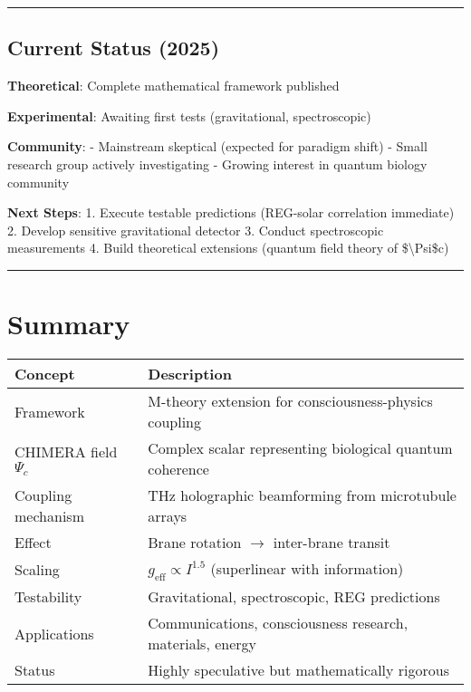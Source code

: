 \begin{center}\rule{0.5\linewidth}{0.5pt}\end{center}

\subsection{Current Status (2025)}\label{current-status-2025}

\textbf{Theoretical}: Complete mathematical framework published

\textbf{Experimental}: Awaiting first tests (gravitational,
spectroscopic)

\textbf{Community}: - Mainstream skeptical (expected for paradigm shift)
- Small research group actively investigating - Growing interest in
quantum biology community

\textbf{Next Steps}: 1. Execute testable predictions (REG-solar
correlation immediate) 2. Develop sensitive gravitational detector 3.
Conduct spectroscopic measurements 4. Build theoretical extensions
(quantum field theory of \$\textbackslash Psi\$c)

\begin{center}\rule{0.5\linewidth}{0.5pt}\end{center}

\section{Summary}
\label{sec:summary}

\begin{center}
\begin{tabular}{@{}ll@{}}
\toprule
\textbf{Concept} & \textbf{Description} \\
\midrule
Framework & M-theory extension for consciousness-physics coupling \\
CHIMERA field $\Psi_c$ & Complex scalar representing biological quantum coherence \\
Coupling mechanism & THz holographic beamforming from microtubule arrays \\
Effect & Brane rotation $\rightarrow$ inter-brane transit \\
Scaling & $g_{\text{eff}} \propto I^{1.5}$ (superlinear with information) \\
Testability & Gravitational, spectroscopic, REG predictions \\
Applications & Communications, consciousness research, materials, energy \\
Status & Highly speculative but mathematically rigorous \\
\bottomrule
\end{tabular}
\end{center}

